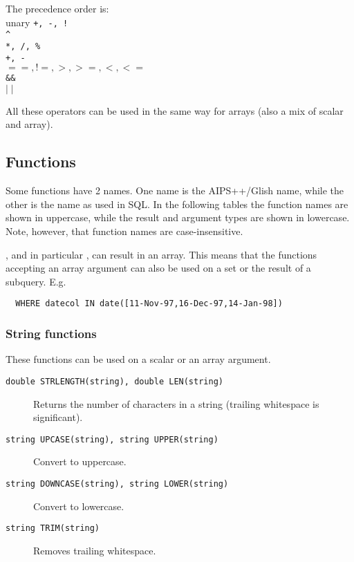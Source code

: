 \begin{description}
  \item The precedence order is:
       \\unary \texttt{+, -, !}
       \\\verb+^+
       \\\texttt{*, /, \%}
       \\\texttt{+, -}
       \\\texttt{$==, !=, >, >=, <, <=$}
       \\\texttt{\&\&}
       \\\texttt{$\mid\mid$}
\end{description}
All these operators can be used in the same way for arrays
(also a mix of scalar and array).

\subsection{\label{TAQL:FUNCTIONS}Functions}
Some functions have 2 names. One name is the AIPS++/Glish name, while the
other is the name as used in SQL.
In the following tables the function names are shown in uppercase,
while the result and argument types are shown in lowercase.
Note, however, that function names are case-insensitive.

, and in particular
, can result in an array.
This means that the functions accepting an array argument can also
be used on a set or the result of a subquery. E.g.
\begin{verbatim}
  WHERE datecol IN date([11-Nov-97,16-Dec-97,14-Jan-98])
\end{verbatim}
\subsubsection{String functions}
These functions can be used on a scalar or an array argument.
\begin{description}
  \item[ \texttt{double STRLENGTH(string),  double LEN(string)}]
       Returns the number of characters in a string
       (trailing whitespace is significant).
  \item[ \texttt{string UPCASE(string), string UPPER(string) }]
        Convert to uppercase.
  \item[ \texttt{string DOWNCASE(string),  string LOWER(string)}]
        Convert to lowercase.
  \item[ \texttt{string TRIM(string)}]
       Removes trailing whitespace.
\end{description}

